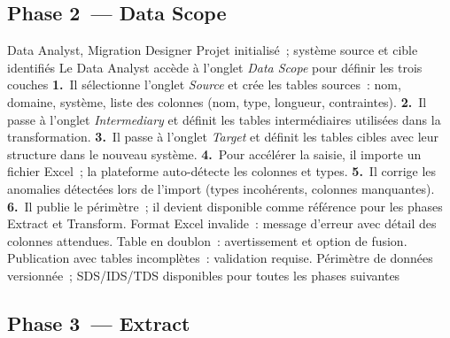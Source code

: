 \subsection*{Phase 2~--- Data Scope}

  {Data Analyst, Migration Designer}
  {Projet initialisé~; système source et cible identifiés}
  {Le Data Analyst accède à l'onglet \textit{Data Scope} pour définir les trois couches}
  {\textbf{1.}~Il sélectionne l'onglet \textit{Source} et crée les tables sources~: nom, domaine, système, liste des colonnes (nom, type, longueur, contraintes).\newline
   \textbf{2.}~Il passe à l'onglet \textit{Intermediary} et définit les tables intermédiaires utilisées dans la transformation.\newline
   \textbf{3.}~Il passe à l'onglet \textit{Target} et définit les tables cibles avec leur structure dans le nouveau système.\newline
   \textbf{4.}~Pour accélérer la saisie, il importe un fichier Excel~; la plateforme auto-détecte les colonnes et types.\newline
   \textbf{5.}~Il corrige les anomalies détectées lors de l'import (types incohérents, colonnes manquantes).\newline
   \textbf{6.}~Il publie le périmètre~; il devient disponible comme référence pour les phases Extract et Transform.}
  {Format Excel invalide~: message d'erreur avec détail des colonnes attendues. Table en doublon~: avertissement et option de fusion. Publication avec tables incomplètes~: validation requise.}
  {Périmètre de données versionnée~; SDS/IDS/TDS disponibles pour toutes les phases suivantes}

\subsection*{Phase 3~--- Extract}


